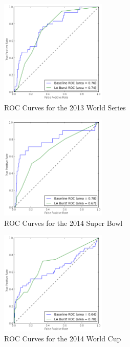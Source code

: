 \documentclass{sig-alternate}
\begin{document}
\begin{figure}[h]
\begin{center}
\includegraphics[width=2in]{./figures/roc_2013_WorldSeries.png}
\caption{ROC Curves for the 2013 World Series}
\label{fig:roc2013WorldSeries}
\end{center}
\end{figure}

\begin{figure}[h]
\begin{center}
\includegraphics[width=2in]{./figures/roc_2014_SuperBowl.png}
\caption{ROC Curves for the 2014 Super Bowl}
\label{fig:roc2014SuperBowl}
\end{center}
\end{figure}

\begin{figure}[h]
\begin{center}
\includegraphics[width=2in]{./figures/roc_2014_WorldCup.png}
\caption{ROC Curves for the 2014 World Cup}
\label{fig:roc2014WorldCup}
\end{center}
\end{figure}
\end{document}
